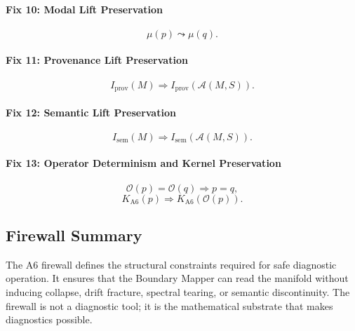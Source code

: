 \paragraph{Fix 10: Modal Lift Preservation}
\[
\mu(p) \leadsto \mu(q).
\]

\paragraph{Fix 11: Provenance Lift Preservation}
\[
I_{\mathrm{prov}}(M) \Rightarrow I_{\mathrm{prov}}(\mathcal{A}(M,S)).
\]

\paragraph{Fix 12: Semantic Lift Preservation}
\[
I_{\mathrm{sem}}(M) \Rightarrow I_{\mathrm{sem}}(\mathcal{A}(M,S)).
\]

\paragraph{Fix 13: Operator Determinism and Kernel Preservation}
\[
\mathcal{O}(p) = \mathcal{O}(q) \Rightarrow p = q,
\]
\[
K_{\mathrm{A6}}(p) \Rightarrow K_{\mathrm{A6}}(\mathcal{O}(p)).
\]

\subsection{Firewall Summary}

The A6 firewall defines the structural constraints required for safe
diagnostic operation. It ensures that the Boundary Mapper can read the
manifold without inducing collapse, drift fracture, spectral tearing, or
semantic discontinuity. The firewall is not a diagnostic tool; it is the
mathematical substrate that makes diagnostics possible.
